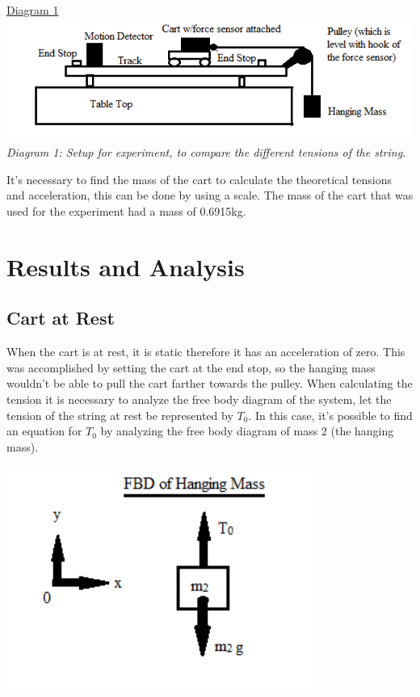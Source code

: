 \documentclass[aps,letterpaper,11pt]{revtex4}
\begin{document}
\newpage

\begin{center}
\underline{Diagram 1}\\
\includegraphics[width=6in]{Setup.png}\\
\textit{Diagram 1: Setup for experiment, to compare the different tensions of the string.}\\
\end{center}

It's necessary to find the mass of the cart to calculate the theoretical tensions and acceleration, this can be done by using a scale. The mass of the cart that was used for the experiment had a mass of 0.6915kg.

\section{Results and Analysis}

\subsection{Cart at Rest}

When the cart is at rest, it is static therefore it has an acceleration of zero. This was accomplished by setting the cart at the end stop, so the hanging mass wouldn't be able to pull the cart farther towards the pulley. When calculating the tension it is necessary to analyze the free body diagram of the system, let the tension of the string at rest be represented by $T_0$. In this case, it's possible to find an equation for $T_0$ by analyzing the free body diagram of mass 2 (the hanging mass).

\begin{center}
\includegraphics[width=4in]{FBDM2REST.png}\\
\end{center}
\end{document}
